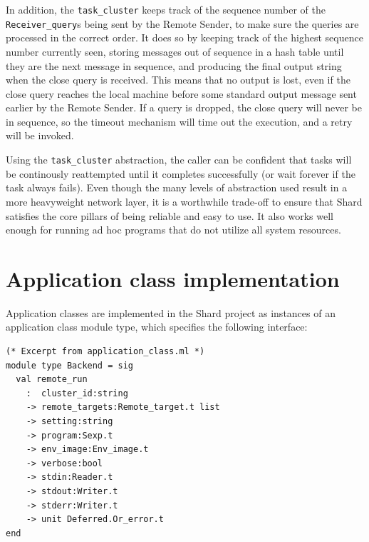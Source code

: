 \documentclass[oneside]{report}
\begin{document}
In addition, the \texttt{task\_cluster} keeps track of the sequence number of the \texttt{Receiver\_query}s being sent by the Remote Sender, to make sure the queries are processed in the correct order.
It does so by keeping track of the highest sequence number currently seen, storing messages out of sequence in a hash table until they are the next message in sequence, and producing the final output string when the close query is received.
This means that no output is lost, even if the close query reaches the local machine before some standard output message sent earlier by the Remote Sender.
If a query is dropped, the close query will never be in sequence, so the timeout mechanism will time out the execution, and a retry will be invoked.

Using the \texttt{task\_cluster} abstraction, the caller can be confident that tasks will be continously reattempted until it completes successfully (or wait forever if the task always fails).
Even though the many levels of abstraction used result in a more heavyweight network layer, it is a worthwhile trade-off to ensure that Shard satisfies the core pillars of being reliable and easy to use. It also works well enough for running ad hoc programs that do not utilize all system resources.

\section{Application class implementation}


Application classes are implemented in the Shard project as instances of an application class module type, which specifies the following interface:

\begin{minipage}[c]{\textwidth-15pt}
  \begin{lstlisting}
(* Excerpt from application_class.ml *)
module type Backend = sig
  val remote_run
    :  cluster_id:string
    -> remote_targets:Remote_target.t list
    -> setting:string
    -> program:Sexp.t
    -> env_image:Env_image.t
    -> verbose:bool
    -> stdin:Reader.t
    -> stdout:Writer.t
    -> stderr:Writer.t
    -> unit Deferred.Or_error.t
end
\end{lstlisting}
  \smallskip
\end{minipage}
\end{document}
